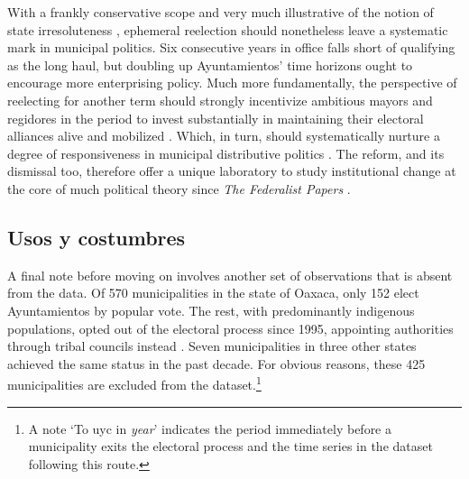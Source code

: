 \documentclass[letter,12pt]{article}
\begin{document}

With a frankly conservative scope and very much illustrative of the notion of state irresoluteness \citep{cox.mccubbins.2001}, ephemeral reelection should nonetheless leave a systematic mark in municipal politics. Six consecutive years in office falls short of qualifying as the long haul, but doubling up Ayuntamientos' time horizons ought to encourage more enterprising policy. Much more fundamentally, the perspective of reelecting for another term should strongly incentivize ambitious mayors and regidores in the period to invest substantially in maintaining their electoral alliances alive and mobilized \citep{cain.etal.1987, motolinia-reel-pork2021}. Which, in turn, should systematically nurture a degree of responsiveness in municipal distributive politics \citep{cox.mccubbins.1986, jacobson.kernell.1983}. The reform, and its dismissal too, therefore offer a unique laboratory to study institutional change at the core of much political theory since \emph{The Federalist Papers} \citep{madison.etal.1788, mayhew.1974, schlesinger.1966, miller.hammond.1989}.

\subsection{Usos y costumbres}\label{S:uyc}

A final note before moving on involves another set of observations that is absent from the data. Of 570 municipalities in the state of Oaxaca, only 152 elect Ayuntamientos by popular vote. The rest, with predominantly indigenous populations, opted out of the electoral process since 1995, appointing authorities through tribal councils instead \citep[known as \emph{usos y costumbres} institutions, see][]{elizarraras.2002, eisenstadt.rios.uyc.2014}. Seven municipalities in three other states achieved the same status in the past decade. For obvious reasons, these 425 municipalities are excluded from the dataset.\footnote{A note `To uyc in \emph{year}' indicates the period immediately before a municipality exits the electoral process and the time series in the dataset following this route.}
\end{document}
